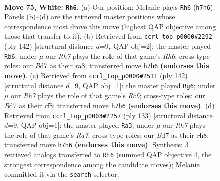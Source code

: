 \documentclass[11pt]{article}
\begin{document}
\clearpage

\begin{figure}[p]\centering
\begin{subfigure}{0.46\textwidth}\centering
\resizebox{\linewidth}{!}{%
\newchessgame
\chessboard[
  setfen={8/3B1P1R/8/k7/8/8/5K1P/8 w - - 3 75},
  showmover=false,
  pgfstyle=straightmove, color=movearrow, markmove={h7-h6}
]}
\caption{}
\end{subfigure}\hfill
\begin{subfigure}{0.46\textwidth}\centering
\resizebox{\linewidth}{!}{%
\newchessgame
\chessboard[
  setfen={r7/8/7R/5p2/7P/2K2k2/8/8 w - - 5 72},
  showmover=false,
  pgfstyle=straightmove, color=movearrow, markmove={h6-b6}
]}
\caption{}
\end{subfigure}
\\[4pt]
\begin{subfigure}{0.46\textwidth}\centering
\resizebox{\linewidth}{!}{%
\newchessgame
\chessboard[
  setfen={5r2/k7/2R5/p7/8/8/K1P5/8 w - - 16 72},
  showmover=false,
  pgfstyle=straightmove, color=movearrow, markmove={c6-g6}
]}
\caption{}
\end{subfigure}\hfill
\begin{subfigure}{0.46\textwidth}\centering
\resizebox{\linewidth}{!}{%
\newchessgame
\chessboard[
  setfen={7R/8/p2k4/8/8/3P4/r7/4K3 b - - 11 67},
  showmover=false,
  pgfstyle=straightmove, color=movearrow, markmove={a2-a3}
]}
\caption{}
\end{subfigure}
\caption{\textbf{Move 75, White: \texttt{Rh6}.} (a) Our position; Melanie plays \texttt{Rh6} (\texttt{h7h6}). Panels (b)--(d) are the retrieved master positions whose correspondence most drove this move (highest QAP objective among those that transfer to it). (b) Retrieved from \texttt{ccrl\_top\_p0000\#2292} (ply 142) [structural distance $d$=9, QAP obj=2]: the master played \texttt{Rb6}; under $\mu$ our \emph{Rh7} plays the role of that game's \emph{Rh6}; cross-type roles: our \emph{B}d7 as their \emph{r}a8; transferred move \texttt{h7h6} \textbf{(endorses this move)}. (c) Retrieved from \texttt{ccrl\_top\_p0000\#2511} (ply 142) [structural distance $d$=9, QAP obj=1]: the master played \texttt{Rg6}; under $\mu$ our \emph{Rh7} plays the role of that game's \emph{Rc6}; cross-type roles: our \emph{B}d7 as their \emph{r}f8; transferred move \texttt{h7h6} \textbf{(endorses this move)}. (d) Retrieved from \texttt{ccrl\_top\_p0003\#2257} (ply 133) [structural distance $d$=9, QAP obj=1]: the master played \texttt{Ra3}; under $\mu$ our \emph{Rh7} plays the role of that game's \emph{Ra7}; cross-type roles: our \emph{B}d7 as their \emph{r}h8; transferred move \texttt{h7h6} \textbf{(endorses this move)}. Synthesis: 3 retrieved analogs transferred to \texttt{Rh6} (summed QAP objective 4, the strongest correspondence among the candidate moves); Melanie committed it via the \texttt{search} selector.}
\label{fig:thought-m148}
\end{figure}
\end{document}
